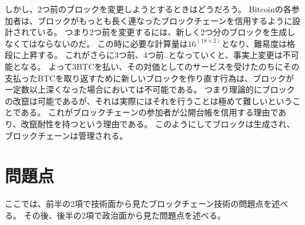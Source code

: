 しかし、2つ前のブロックを変更しようとするときはどうだろう。
Bitcoinの各参加者は、ブロックがもっとも長く連なったブロックチェーンを信用するように設計されている。
つまり2つ前を変更するには、新しく2つ分のブロックを生成しなくてはならないのだ。
この時に必要な計算量は\(16^(18\times2) \)となり、難易度は格段に上昇する。
これがさらに3つ前、4つ前..となっていくと、事実上変更は不可能となる。
よって3BTCを払い、その対価としてのサービスを受けたのちにその支払ったBTCを取り返すために新しいブロックを作り直す行為は、ブロックが一定数以上深くなった場合においては不可能である。
つまり理論的にブロックの改竄は可能であるが、それは実際にはそれを行うことは極めて難しいということである。
これがブロックチェーンの参加者が公開台帳を信用する理由であり、改竄耐性を持つという理由である。
このようにしてブロックは生成され、ブロックチェーンは管理される。

\section{問題点}
ここでは、前半の2項で技術面から見たブロックチェーン技術の問題点を述べる。
その後、後半の2項で政治面から見た問題点を述べる。
